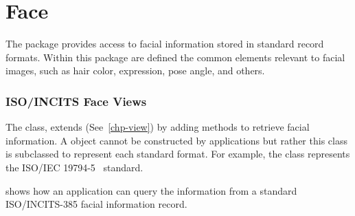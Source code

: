 %
%
\chapter{Face}
\label{chp-face}
The  package provides access to facial information stored in
standard record formats. Within this package are defined the common elements
relevant to facial images, such as hair color, expression, pose angle, and
others.

\subsection{ISO/INCITS Face Views}
The  class, extends 
(See~\ref{chp-view}) by adding methods to retrieve facial information. A
 object cannot be constructed by applications but
rather this class is subclassed to represent each standard format.
For example, the  class represents the 
ISO/IEC 19794-5~\cite{std:ansi385-2004} standard.

 shows how an application can query the information from
a standard ISO/INCITS-385 facial information record.

